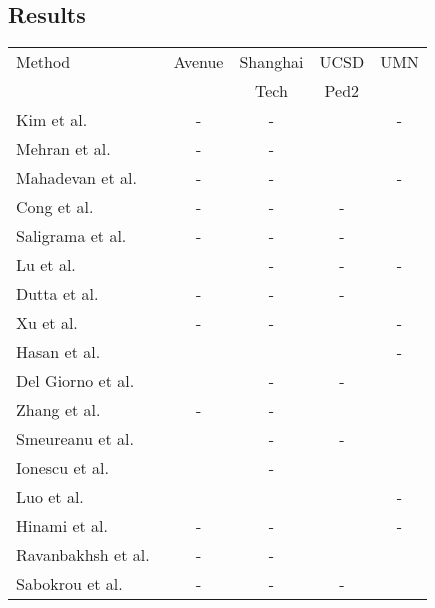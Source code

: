\documentclass[10pt,twocolumn,letterpaper]{article}
\begin{document}
\vspace*{-0.1cm}
\subsection{Results}
\vspace*{-0.1cm}

\begin{table}[t]
\setlength\tabcolsep{4.0pt}
\small{
\begin{center}
\begin{tabular}{|l|c|c|c|c|}
\hline
Method 																& Avenue			& Shanghai		& UCSD  			& UMN \\
			 																&						& Tech				& Ped2 				&  \\
\hline
\hline
Kim et al.~\cite{Kim-CVPR-2009}							& -					& - 					&  			& - \\
Mehran et al.~\cite{Mehran-CVPR-2009}				& -					& - 					&  			&  \\
Mahadevan et al.~\cite{Mahadevan-CVPR-2010}	& -					& -	 				& 	 		& - \\
Cong et al.~\cite{Cong-CVPR-2011}						& -					& - 					& -					&  \\
Saligrama et al.~\cite{Saligrama-CVPR-2012}		& -					& -	 				& -					&  \\
Lu et al.~\cite{Lu-ICCV-2013}								& 			& - 					& -					& - \\
Dutta et al.~\cite{Dutta-AAAI-2015}						& -					& - 					& -					&  \\
Xu et al.~\cite{Xu-BMVC-2015,Xu-CVIU-2017}		& -					& - 					& 			& - \\
Hasan et al.~\cite{Hasan-CVPR-2016}					& 			& 			& 			& - \\
Del Giorno et al.~\cite{Giorno-ECCV-2016}			& 			& -					& - 					&  \\
Zhang et al.~\cite{Zhang-PR-2016}						& -					& - 					& 			&  \\
Smeureanu et al.~\cite{Smeureanu-ICIAP-2017}	& 			& -					& -					&  \\
Ionescu et al.~\cite{Ionescu-ICCV-2017}				& 			& -					& 			&  \\
Luo et al.~\cite{Luo-ICCV-2017}							& 			&  			& 			& - \\
Hinami et al.~\cite{Hinami-ICCV-2017}					& - 					& -					& 			& - \\
Ravanbakhsh et al.~\cite{Ravanbakhsh-ICIP-2017}		& -			& -					&  			&  \\
Sabokrou et al.~\cite{Sabokrou-IP-2017}				& -					& - 					& -					&  \\

\end{tabular}
\end{center}}
\end{table}
\end{document}
